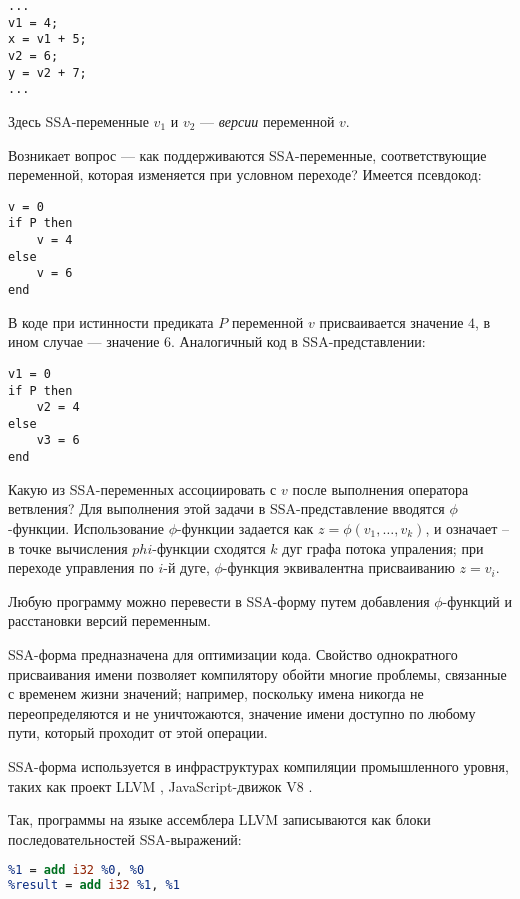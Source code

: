 \begin{lstlisting}
...
v1 = 4;
x = v1 + 5;
v2 = 6;
y = v2 + 7;
...
\end{lstlisting}

Здесь SSA-переменные $v_1$ и $v_2$ --- \textit{версии} переменной $v$.

Возникает вопрос --- как поддерживаются SSA-переменные, соответствующие
переменной, которая изменяется при условном переходе? Имеется псевдокод:

\begin{lstlisting}
v = 0
if P then
    v = 4
else
    v = 6
end
\end{lstlisting}

В коде при истинности предиката $P$ переменной $v$ присваивается значение $4$,
в ином случае --- значение $6$. Аналогичный код в SSA-представлении:

\begin{lstlisting}
v1 = 0
if P then
    v2 = 4
else
    v3 = 6
end
\end{lstlisting}

Какую из SSA-переменных ассоциировать с $v$ после выполнения оператора ветвления?
Для выполнения этой задачи в SSA-представление вводятся $\phi$-функции.
Использование $\phi$-функции задается как $z = \phi(v_1, \dots, v_k)$, и
означает -- в точке вычисления $phi$-функции сходятся $k$ дуг графа потока
упраления; при переходе управления по $i$-й дуге, $\phi$-функция эквивалентна
присваиванию $z = v_i$.

Любую программу можно перевести в SSA-форму путем добавления $\phi$-функций
и расстановки версий переменным.

SSA-форма предназначена для оптимизации кода.
Свойство однократного присваивания имени позволяет компилятору
обойти многие проблемы, связанные с временем жизни значений; например,
поскольку имена никогда не переопределяются и не уничтожаются, значение
имени доступно по любому пути, который проходит от этой операции.

SSA-форма используется в инфраструктурах компиляции промышленного уровня,
таких как проект LLVM \cite{llvmlang}, JavaScript-движок V8 \cite{v8crankshaft}.

Так, программы на языке ассемблера LLVM записываются как блоки
последовательностей SSA-выражений:

\begin{lstlisting}[language=llvm]
%0 = add i32 %X, %X
%1 = add i32 %0, %0
%result = add i32 %1, %1
\end{lstlisting}

